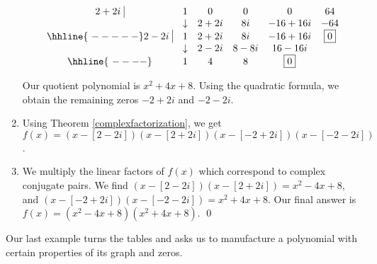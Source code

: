 \begin{ex}
\begin{enumerate}
\[ \begin{array}{cccccc}
  2+2i \, \, \vline& 1 & 0 & 0  & 0 & 64 \\

  & \downarrow     &  2+2i  &  8i & -16+16i & -64\\ \hhline{~-----} 
  
  2-2i \, \, \vline  & 1 &  2+2i  & 8i & -16+16i &  \fbox{$0$}  \\
    
               & \downarrow &  2-2i  &  8-8i  & 16-16i &\\ \hhline{~----} 
 
                & 1  &  4  & 8& \fbox{0} &   \\
  


\end{array}\]

Our quotient polynomial is $x^2+4x+8$.  Using the quadratic formula, we obtain the remaining zeros $-2+2i$ and $-2-2i$.  

\item  Using Theorem \ref{complexfactorization}, we get $f(x) = (x-[2-2i])(x-[2+2i])(x-[-2+2i])(x-[-2-2i])$.

\item  We multiply the linear factors of $f(x)$ which correspond to complex conjugate pairs.  We find $(x-[2-2i])(x-[2+2i]) = x^2-4x+8$, and $(x-[-2+2i])(x-[-2-2i]) = x^2+4x+8$.  Our final answer is $f(x) =  \left(x^2-4x+8\right) \left(x^2+4x+8\right)$. \qed

\end{enumerate}

\end{ex}


Our last example turns the tables and asks us to manufacture a polynomial with certain properties of its graph and zeros.

